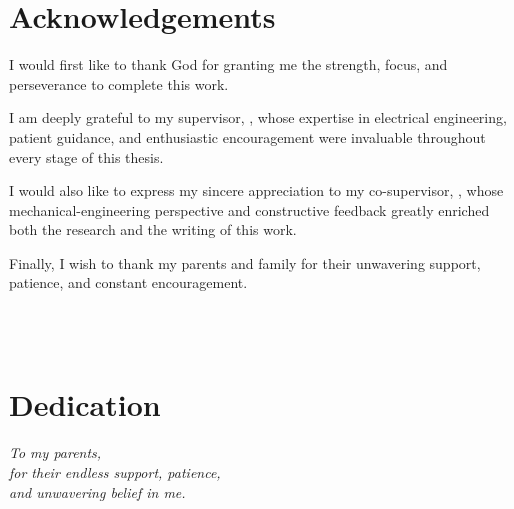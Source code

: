 \chapter*{Acknowledgements}

I would first like to thank God for granting me the strength, focus, and perseverance to complete this work.

\vspace{1em}

I am deeply grateful to my supervisor, \supervisorOne, whose expertise in electrical engineering, patient guidance, and enthusiastic encouragement were invaluable throughout every stage of this thesis.

\vspace{1em}

I would also like to express my sincere appreciation to my co-supervisor, \cosupervisor, whose mechanical-engineering perspective and constructive feedback greatly enriched both the research and the writing of this work.

\vspace{1em}

Finally, I wish to thank my parents and family for their unwavering support, patience, and constant encouragement.

\vspace{2cm}
\begin{flushright}
\authorOfThesis\\
\submissionDate\\
\end{flushright}
\clearpage

\chapter*{Dedication}
\thispagestyle{empty}
\vspace*{3cm}
\begin{center}
\textit{To my parents,\\[0.5em]
for their endless support, patience,\\[0.5em]
and unwavering belief in me.}
\end{center}
\clearpage

